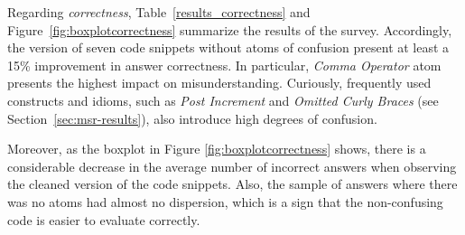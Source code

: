 Regarding \emph{correctness}, Table~\ref{results_correctness} and Figure~\ref{fig:boxplotcorrectness} summarize the results of the survey. Accordingly, the version of seven code snippets without atoms of confusion present at least a 15\% improvement in answer correctness. In particular, \emph{Comma Operator} atom presents the highest impact on misunderstanding. 
Curiously, frequently used constructs and idioms, such as \emph{Post Increment} and \emph{Omitted Curly Braces} (see Section~\ref{sec:msr-results}), also introduce high degrees of confusion.

Moreover, as the boxplot in Figure \ref{fig:boxplotcorrectness} shows, there is a considerable decrease in the average number of incorrect answers when observing the cleaned version of the code snippets. Also, the sample of answers where there was no atoms had almost no dispersion, which is a sign that the non-confusing code is easier to evaluate correctly.


